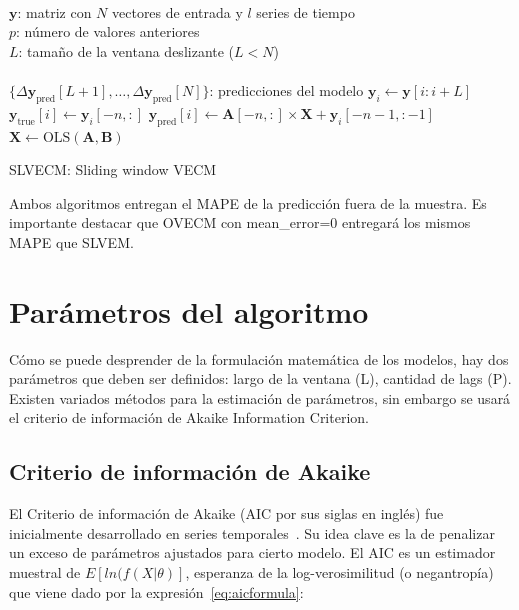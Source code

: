 \begin{algorithm}[ht]
\begin{algorithmic}[1]
\REQUIRE $\,$ \\
$\mathbf{y}$: matriz con $N$ vectores de entrada y $l$ series de tiempo\\
$p$: número de valores anteriores\\
$L$: tamaño de la ventana deslizante ($L<N$) \\
\ENSURE  $\,$ \\
$\{\Delta \mathbf{y}_{\text{pred}}[L+1],\dots,\Delta \mathbf{y}_{\text{pred}}[N]\}$: predicciones del modelo
    \STATE $\mathbf{y}_i \gets \mathbf{y}[i:i+L]$
        \STATE $\mathbf{y}_{\text{true}}[i] \gets \mathbf{y}_i[-n,:]$
        \STATE $\mathbf{y}_{\text{pred}}[i] \gets \mathbf{A}[-n,:] \times \mathbf{X} + \mathbf{y}_i[-n-1,:-1]$
    \ENDIF
    \STATE $\mathbf{X} \gets \text{OLS} (\mathbf{A},\mathbf{B})$
\ENDFOR
\end{algorithmic}
\caption{SLVECM: Sliding window VECM}
\label{alg:SLVECM}
\end{algorithm}

Ambos algoritmos entregan el MAPE de la predicción fuera de la muestra. Es
importante destacar que OVECM con mean\_error=0 entregará los mismos MAPE que
SLVEM.

\section{Parámetros del algoritmo}
Cómo se puede desprender de la formulación matemática de los modelos, hay dos
parámetros que deben ser definidos: largo de la ventana (L), cantidad de lags
(P). Existen variados métodos para la estimación de parámetros, sin embargo se
usará el criterio de información de Akaike Information Criterion.

\subsection{Criterio de información de Akaike}
El Criterio de información de Akaike (AIC por sus siglas en inglés) fue
inicialmente desarrollado en series temporales~\cite{akaike1998information}. Su idea clave es
la de penalizar un exceso de parámetros ajustados para cierto modelo. El AIC es
un estimador muestral de $E[ln(f(X|\theta)]$, esperanza de la log-verosimilitud
(o negantropía) que viene dado por la expresión~\ref{eq:aicformula}:

